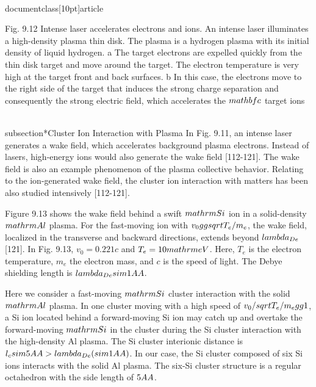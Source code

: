 \\documentclass[10pt]{article}
\begin{document}
{{{{{{Fig. 9.12 Intense laser accelerates electrons and ions. An intense laser illuminates a high-density plasma thin disk. The plasma is a hydrogen plasma with its initial density of liquid hydrogen. a The target electrons are expelled quickly from the thin disk target and move around the target. The electron temperature is very high at the target front and back surfaces. b In this case, the electrons move to the right side of the target that induces the strong charge separation and consequently the strong electric field, which accelerates the $\\mathbf{c}$ target ions

\\subsection*{Cluster Ion Interaction with Plasma}
In Fig. 9.11, an intense laser generates a wake field, which accelerates background plasma electrons. Instead of lasers, high-energy ions would also generate the wake field [112-121]. The wake field is also an example phenomenon of the plasma collective behavior. Relating to the ion-generated wake field, the cluster ion interaction with matters has been also studied intensively [112-121].

Figure 9.13 shows the wake field behind a swift $\\mathrm{Si}$ ion in a solid-density $\\mathrm{Al}$ plasma. For the fast-moving ion with $v_{0} \\gg \\sqrt{T_{e} / m_{e}}$, the wake field, localized in the transverse and backward directions, extends beyond $\\lambda_{D e}$ [121]. In Fig. 9.13, $v_{0}=0.221 c$ and $T_{e}=10 \\mathrm{eV}$. Here, $T_{e}$ is the electron temperature, $m_{e}$ the electron mass, and $c$ is the speed of light. The Debye shielding length is $\\lambda_{D e} \\sim 1 \\AA$.

Here we consider a fast-moving $\\mathrm{Si}$ cluster interaction with the solid $\\mathrm{Al}$ plasma. In one cluster moving with a high speed of $v_{0} / \\sqrt{T_{e} / m_{e}} \\gg 1$, a Si ion located behind a forward-moving Si ion may catch up and overtake the forward-moving $\\mathrm{Si}$ in the cluster during the Si cluster interaction with the high-density Al plasma. The Si cluster interionic distance is $l_{c} \\sim 5 \\AA>\\lambda_{D e}(\\sim 1 \\AA)$. In our case, the Si cluster composed of six Si ions interacts with the solid Al plasma. The six-Si cluster structure is a regular octahedron with the side length of $5 \\AA$.

}}}}}}
\end{document}
